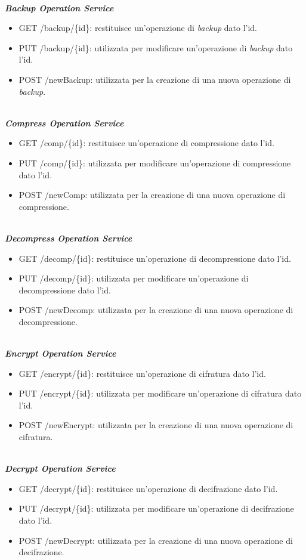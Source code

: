 \ \\
\textbf{\textit{Backup Operation Service}}
\begin{itemize}
    \item GET /backup/\{id\}: restituisce un'operazione di \textit{backup} dato l'id.
    \item PUT /backup/\{id\}: utilizzata per modificare un'operazione di \textit{backup} dato l'id.
    \item POST /newBackup: utilizzata per la creazione di una nuova operazione di \textit{backup}.
\end{itemize}

\ \\
\textbf{\textit{Compress Operation Service}}
\begin{itemize}
    \item GET /comp/\{id\}: restituisce un'operazione di compressione dato l'id.
    \item PUT /comp/\{id\}: utilizzata per modificare un'operazione di compressione dato l'id.
    \item POST /newComp: utilizzata per la creazione di una nuova operazione di compressione.
\end{itemize}

\ \\
\textbf{\textit{Decompress Operation Service}}
\begin{itemize}
    \item GET /decomp/\{id\}: restituisce un'operazione di decompressione dato l'id.
    \item PUT /decomp/\{id\}: utilizzata per modificare un'operazione di decompressione dato l'id.
    \item POST /newDecomp: utilizzata per la creazione di una nuova operazione di decompressione.
\end{itemize}

\ \\
\textbf{\textit{Encrypt Operation Service}}
\begin{itemize}
    \item GET /encrypt/\{id\}: restituisce un'operazione di cifratura dato l'id.
    \item PUT /encrypt/\{id\}: utilizzata per modificare un'operazione di cifratura dato l'id.
    \item POST /newEncrypt: utilizzata per la creazione di una nuova operazione di cifratura.
\end{itemize}

\ \\
\textbf{\textit{Decrypt Operation Service}}
\begin{itemize}
    \item GET /decrypt/\{id\}: restituisce un'operazione di decifrazione dato l'id.
    \item PUT /decrypt/\{id\}: utilizzata per modificare un'operazione di decifrazione dato l'id.
    \item POST /newDecrypt: utilizzata per la creazione di una nuova operazione di decifrazione.
\end{itemize}


